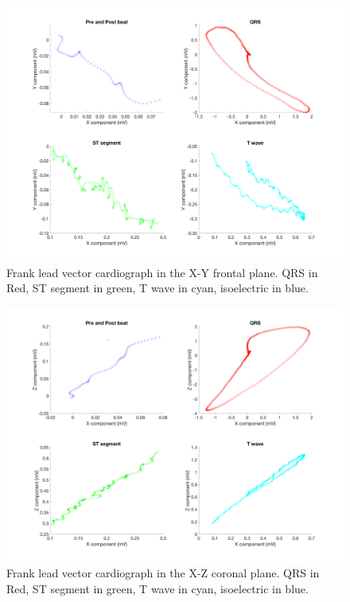 \documentclass[12pt]{article}
\begin{document}
\begin{figure}[H]
	
	\centering
	\includegraphics[width = .75\textwidth]{Figures/FrankLeads_xy.png}
	\caption{Frank lead vector cardiograph in the X-Y frontal plane. QRS in Red, ST segment in green, T wave in cyan, isoelectric in blue. }
	\label{fig:Frank_xy}
\end{figure}

\begin{figure}[H]
	
	\centering
	\includegraphics[width = .75\textwidth]{Figures/FrankLeads_xz.png}
	\caption{ Frank lead vector cardiograph in the X-Z coronal plane. QRS in Red, ST segment in green, T wave in cyan, isoelectric in blue.}
	\label{fig:Frank_xz}
\end{figure}
\end{document}
